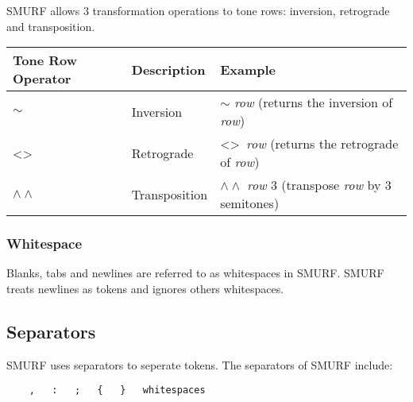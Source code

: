 SMURF allows 3 transformation operations to tone rows: inversion, retrograde and
transposition.
\begin{table} [H]
\centering
\begin{tabularx}{0.9\textwidth}{llX}
\hline\hline
Tone Row Operator & Description & Example \\
\hline\hline
   $\sim$ & Inversion & $\sim$ {\it row} (returns the inversion of {\it row})\\ \hline
   \textless\textgreater & Retrograde & \textless\textgreater~{\it row} (returns the
           retrograde of {\it row})\\ \hline
   $\wedge\wedge$ & Transposition & $\wedge\wedge$ {\it row} 3 (transpose {\it row} by 3
           semitones)\\ \hline
\end{tabularx}
\end{table}


\subsubsection{Whitespace}
Blanks, tabs and newlines are referred to as whitespaces in SMURF. SMURF treats
newlines as tokens and ignores others whitespaces. 


\subsection{Separators}
SMURF uses separators to seperate tokens. The separators of SMURF include:
\begin{verbatim} 
    ,   :   ;   {   }   whitespaces
\end{verbatim}

